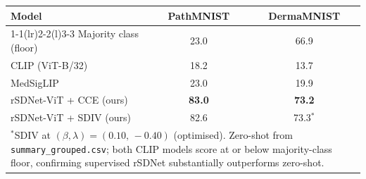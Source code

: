 \begin{table}[t]
\vspace{10pt}

\begin{tabular}{@{}lcc@{}}
\toprule
\textbf{Model} & \textbf{PathMNIST} & \textbf{DermaMNIST} \\
\cmidrule(r){1-1}\cmidrule(lr){2-2}\cmidrule(l){3-3}
Majority class (floor)     & 23.0 & 66.9 \\
\midrule
CLIP (ViT-B/32)            & 18.2 & 13.7 \\
MedSigLIP                  & 23.0 & 19.9 \\
\midrule
rSDNet-ViT + CCE (ours)    & \textbf{83.0} & \textbf{73.2} \\
rSDNet-ViT + SDIV (ours)   & 82.6         & 73.3$^*$     \\
\midrule
\multicolumn{3}{l}{\footnotesize
  $^*$SDIV at $(\beta,\lambda){=}(0.10,\,-0.40)$ (optimised).
  Zero-shot from \texttt{summary\_grouped.csv};
  both CLIP models score at or below majority-class floor,
  confirming supervised rSDNet substantially outperforms zero-shot.
} \\
\bottomrule
\end{tabular}
\end{table}
